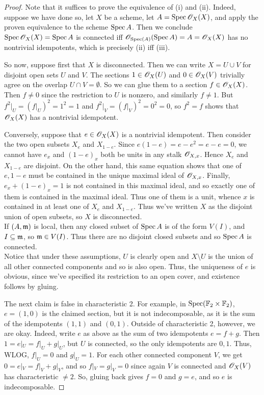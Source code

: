 \begin{proof}
	Note that it suffices to prove the equivalence of (i) and (ii). Indeed, suppose we have done so, let $X$ be a scheme, let $A = \operatorname{Spec} \mathscr{O}_X(X)$, and apply the proven equivalence to the scheme $\operatorname{Spec} A$. Then we conclude $\operatorname{Spec} \mathscr{O}_X(X) = \operatorname{Spec} A$ is connected iff $\mathscr{O}_{\operatorname{Spec}(A)}(\operatorname{Spec} A) = A = \mathscr{O}_X(X)$ has no nontrivial idempotents, which is precisely (ii) iff (iii).
	
	So now, suppose first that $X$ is disconnected. Then we can write $X = U \cup V$ for disjoint open sets $U$ and $V$. The sections $1 \in \mathscr{O}_X(U)$ and $0 \in \mathscr{O}_X(V)$ trivially agree on the overlap $U \cap V = \emptyset$. So we can glue them to a section $f \in \mathscr{O}_X(X)$. Then $f \neq 0$ since the restriction to $U$ is nonzero, and similarly $f \neq 1$. But $f^2|_U = (f|_U)^2 = 1^2 = 1$ and $f^2|_V = (f|_V)^2 = 0^2 = 0$, so $f^2 = f$ shows that $\mathscr{O}_X(X)$ has a nontrivial idempotent.
	
	Conversely, suppose that $e \in \mathscr{O}_X(X)$ is a nontrivial idempotent. Then consider the two open subsets $X_e$ and $X_{1-e}$. Since $e(1-e) = e-e^2 = e-e = 0$, we cannot have $e_x$ and $(1-e)_x$ both be units in any stalk $\mathscr{O}_{X,x}$. Hence $X_e$ and $X_{1-e}$ are disjoint. On the other hand, this same equation shows that one of $e,1-e$ must be contained in the unique maximal ideal of $\mathscr{O}_{X,x}$. Finally, $e_x+(1-e)_x = 1$ is not contained in this maximal ideal, and so exactly one of them is contained in the maximal ideal. Thus one of them is a unit, whence $x$ is contained in at least one of $X_e$ and $X_{1-e}$. Thus we've written $X$ as the disjoint union of open subsets, so $X$ is disconnected. \\
	
	If $(A,\mathfrak{m})$ is local, then any closed subset of $\operatorname{Spec} A$ is of the form $V(I)$, and $I \subseteq \mathfrak{m}$, so $\mathfrak{m} \in V(I)$. Thus there are no disjoint closed subsets and so $\operatorname{Spec} A$ is connected. \\
	
	Notice that under these assumptions, $U$ is clearly open and $X \setminus U$ is the union of all other connected components and so is also open. Thus, the uniqueness of $e$ is obvious, since we've specified its restriction to an open cover, and existence follows by gluing.
	
	The next claim is false in characteristic 2. For example, in $\operatorname{Spec}(\mathbb{F}_2 \times \mathbb{F}_2)$, $e = (1,0)$ is the claimed section, but it is not indecomposable, as it is the sum of the idempotents $(1,1)$ and $(0,1)$. Outside of characteristic 2, however, we are okay. Indeed, write $e$ as above as the sum of two idempotents $e = f+g$. Then $1 = e|_U = f|_U + g|_U$, but $U$ is connected, so the only idempotents are $0,1$. Thus, WLOG, $f|_U = 0$ and $g|_U = 1$. For each other connected component $V$, we get $0 = e|_V = f|_V + g|_V$, and so $f|_V = g|_V = 0$ since again $V$ is connected and $\mathscr{O}_X(V)$ has characteristic $\neq 2$. So, gluing back gives $f = 0$ and $g = e$, and so $e$ is indecomposable.
	

\end{proof}
